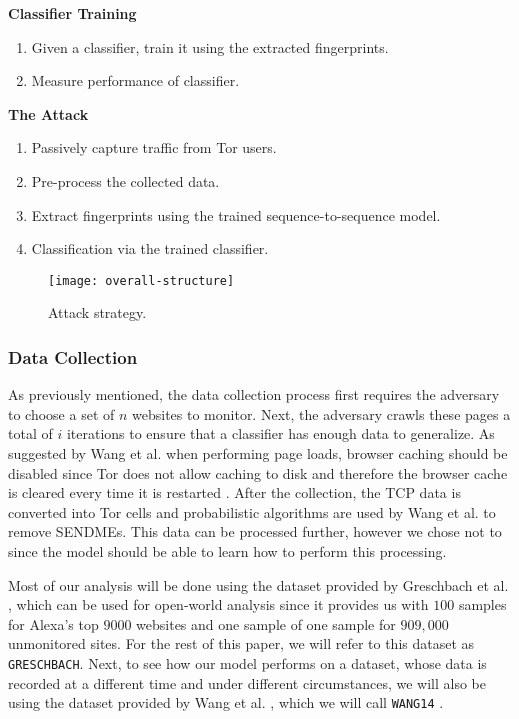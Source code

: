 \noindent
\textbf{Classifier Training}
\begin{enumerate}[resume]
  \item Given a classifier, train it using the extracted fingerprints.
  \item Measure performance of classifier.
\end{enumerate}

\noindent
\textbf{The Attack}
\begin{enumerate}[resume]
  \item Passively capture traffic from Tor users.
  \item Pre-process the collected data.
  \item Extract fingerprints using the trained sequence-to-sequence model.
  \item Classification via the trained classifier.
\end{enumerate}

\begin{figure}[ht]
  \centering
  \texttt{[image: overall-structure]}
  \caption{Attack strategy.}
  \label{fig:attack-strategy}
\end{figure}

\subsubsection{Data Collection}

As previously mentioned, the data collection process first requires the adversary to choose a set of $n$ websites to monitor.
Next, the adversary crawls these pages a total of $i$ iterations to ensure that a classifier has enough data to generalize.
As suggested by Wang et al. when performing page loads, browser caching should be disabled since Tor does not allow caching to disk and therefore the browser cache is cleared every time it is restarted \cite{wang_goldberg_2013}.
After the collection, the TCP data is converted into Tor cells and probabilistic algorithms are used by Wang et al. \cite{wang_goldberg_2013} to remove SENDMEs.
This data can be processed further, however we chose not to since the model should be able to learn how to perform this processing.

Most of our analysis will be done using the dataset provided by Greschbach et al. \cite{greschbach2016effect}, which can be used for open-world analysis since it provides us with $100$ samples for Alexa's top $9000$ websites and one sample of one sample for $909,000$ unmonitored sites.
For the rest of this paper, we will refer to this dataset as \texttt{GRESCHBACH}.
Next, to see how our model performs on a dataset, whose data is recorded at a different time and under different circumstances, we will also be using the dataset provided by Wang et al. \cite{wang_cai_johnson_nithyanand_goldberg_2014}, which we will call \texttt{WANG14} \cite{panchenko2}.

